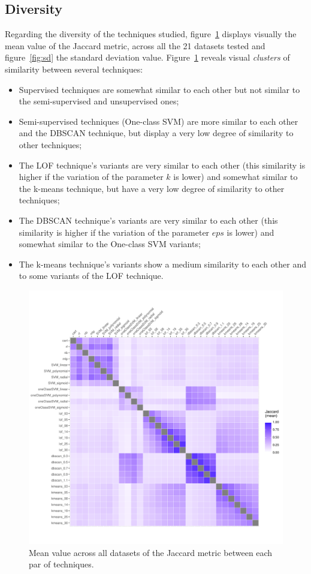 \subsection{Diversity}

Regarding the diversity of the techniques studied, figure~\ref{fig:mean} displays visually the mean value of the Jaccard metric, across all the 21 datasets tested and figure~\ref{fig:sd} the standard deviation value.
Figure~\ref{fig:mean} reveals visual \textit{clusters} of similarity between several techniques:

\begin{itemize}
	\item Supervised techniques are somewhat similar to each other but not similar to the semi-supervised and unsupervised ones;
	\item Semi-supervised techniques (One-class SVM) are more similar to each other and the DBSCAN technique, but display a very low degree of similarity to other techniques;
	\item The LOF technique's variants are very similar to each other (this similarity is higher if the variation of the parameter $k$ is lower) and somewhat similar to the k-means technique, but have a very low degree of similarity to other techniques;
	\item The DBSCAN technique's variants are very similar to each other (this similarity is higher if the variation of the parameter $eps$ is lower) and somewhat similar to the One-class SVM variants;
	\item The k-means technique's variants show a medium similarity to each other and to some variants of the LOF technique.
\end{itemize}

\begin{figure}[ht!]
	\centering
	\includegraphics[width=\textwidth]{figures/plot_mean.pdf}
	\caption{Mean value across all datasets of the Jaccard metric between each par of techniques.}
	\label{fig:mean}
\end{figure}

